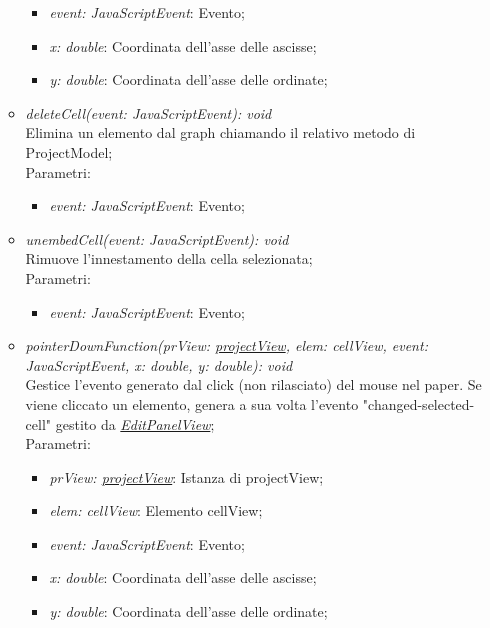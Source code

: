 \documentclass[../DefinizioneDiProdotto.tex]{subfiles}
\begin{document}
\begin{itemize}
\begin{itemize}
\begin{itemize}
								\item \emph{event: JavaScriptEvent}: Evento;
								\item \emph{x: double}: Coordinata dell'asse delle ascisse;
								\item \emph{y: double}: Coordinata dell'asse delle ordinate;
							\end{itemize}
							\item \emph{deleteCell(event: JavaScriptEvent): void} \\
							Elimina un elemento dal graph chiamando il relativo metodo di ProjectModel;\\
							Parametri:
							\begin{itemize}
								\item \emph{event: JavaScriptEvent}: Evento;
							\end{itemize}
							\item \emph{unembedCell(event: JavaScriptEvent): void} \\
							Rimuove l'innestamento della cella selezionata;\\
							Parametri:
							\begin{itemize}
								\item \emph{event: JavaScriptEvent}: Evento;
							\end{itemize}
							\item \emph{pointerDownFunction(prView: \hyperlink{SWEDesigner::Client::View::projectView}{\emph{projectView}}, elem: cellView, event: JavaScriptEvent, x: double, y: double): void} \\
							Gestice l'evento generato dal click (non rilasciato) del mouse nel paper. Se viene cliccato un elemento, genera a sua volta l'evento "changed-selected-cell" gestito da \hyperlink{SWEDesigner::Client::View::EditPanelView}{\emph{EditPanelView}};\\
							Parametri:
							\begin{itemize}
								\item \emph{prView: \hyperlink{SWEDesigner::Client::View::projectView}{\emph{projectView}}}: Istanza di projectView;
								\item \emph{elem: cellView}: Elemento cellView;
								\item \emph{event: JavaScriptEvent}: Evento;
								\item \emph{x: double}: Coordinata dell'asse delle ascisse;
								\item \emph{y: double}: Coordinata dell'asse delle ordinate;
							\end{itemize}

\end{itemize}
\end{itemize}
\end{document}

